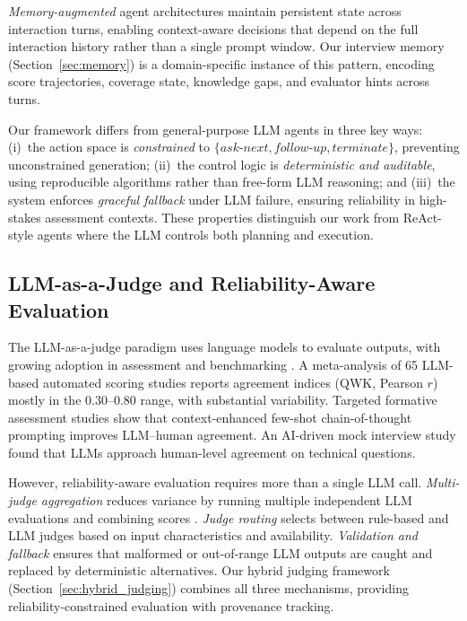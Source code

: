 ﻿\documentclass[final,3p,times,authoryear]{elsarticle}
\begin{document}
\emph{Memory-augmented} agent architectures maintain persistent state across interaction turns, enabling context-aware decisions that depend on the full interaction history rather than a single prompt window. Our interview memory (Section~\ref{sec:memory}) is a domain-specific instance of this pattern, encoding score trajectories, coverage state, knowledge gaps, and evaluator hints across turns.

Our framework differs from general-purpose LLM agents in three key ways: (i)~the action space is \emph{constrained} to $\{\textit{ask-next}, \textit{follow-up}, \textit{terminate}\}$, preventing unconstrained generation; (ii)~the control logic is \emph{deterministic and auditable}, using reproducible algorithms rather than free-form LLM reasoning; and (iii)~the system enforces \emph{graceful fallback} under LLM failure, ensuring reliability in high-stakes assessment contexts. These properties distinguish our work from ReAct-style agents where the LLM controls both planning and execution.

\subsection{LLM-as-a-Judge and Reliability-Aware Evaluation}

\noindent The LLM-as-a-judge paradigm uses language models to evaluate outputs, with growing adoption in assessment and benchmarking \cite{chang2023survey,zhang2023evaluation}. A meta-analysis of 65 LLM-based automated scoring studies \cite{llm_aes_meta2025} reports agreement indices (QWK, Pearson $r$) mostly in the 0.30--0.80 range, with substantial variability. Targeted formative assessment studies \cite{llm_formative2025} show that context-enhanced few-shot chain-of-thought prompting improves LLM--human agreement. An AI-driven mock interview study \cite{ai_mock_ijmlc2025} found that LLMs approach human-level agreement on technical questions.

However, reliability-aware evaluation requires more than a single LLM call. \emph{Multi-judge aggregation} reduces variance by running multiple independent LLM evaluations and combining scores \cite{zhang2023evaluation}. \emph{Judge routing} selects between rule-based and LLM judges based on input characteristics and availability. \emph{Validation and fallback} ensures that malformed or out-of-range LLM outputs are caught and replaced by deterministic alternatives. Our hybrid judging framework (Section~\ref{sec:hybrid_judging}) combines all three mechanisms, providing reliability-constrained evaluation with provenance tracking.
\end{document}
